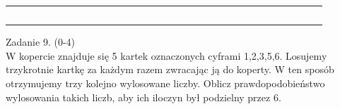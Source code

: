 \documentclass[10pt]{article}
\begin{document}
\begin{center}
\begin{tabular}{|c|c|c|c|c|c|c|c|c|c|c|c|c|c|c|c|c|c|c|c|c|c|c|c|c|c|c|c|c|c|c|c|}
\hline
 &  &  &  &  &  &  &  &  &  &  &  &  &  &  &  &  &  &  &  &  &  &  &  &  &  &  &  &  &  &  &  \\
\hline
 &  &  &  &  &  &  &  &  &  &  &  &  &  &  &  &  &  &  &  &  &  &  &  &  &  &  &  &  &  &  &  \\
\hline
 &  &  &  &  &  &  &  &  &  &  &  &  &  &  &  &  &  &  &  &  &  &  &  &  &  &  &  &  &  &  &  \\
\hline
 &  &  &  &  &  &  &  &  &  &  &  &  &  &  &  &  &  &  &  &  &  &  &  &  &  &  &  &  &  &  &  \\
\hline
 &  &  &  &  &  &  &  &  &  &  &  &  &  &  &  &  &  &  &  &  &  &  &  &  &  &  &  &  &  &  &  \\
\hline
 &  &  &  &  &  &  &  &  &  &  &  &  &  &  &  &  &  &  &  &  &  &  &  &  &  &  &  &  &  &  &  \\
\hline
\end{tabular}
\end{center}

Zadanie 9. (0-4)\\
W kopercie znajduje się 5 kartek oznaczonych cyframi 1,2,3,5,6. Losujemy trzykrotnie kartkę za każdym razem zwracając ją do koperty. W ten sposób otrzymujemy trzy kolejno wylosowane liczby. Oblicz prawdopodobieństwo wylosowania takich liczb, aby ich iloczyn był podzielny przez 6.
\end{document}
